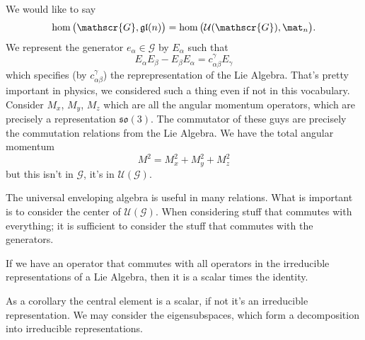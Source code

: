 We would like to say
\begin{equation}
\hom\big(\mathscr{G},\mathfrak{gl}(n)\big)=\hom\big(\mathcal{U}(\mathscr{G}),\mat_{n}\big).
\end{equation}
We represent the generator $e_{\alpha}\in\mathscr{G}$ by
$E_{\alpha}$ such that
\begin{equation}
E_{\alpha}E_{\beta}-E_{\beta}E_{\alpha}=c^{\gamma}_{\alpha\beta}E_{\gamma}
\end{equation}
which specifies (by $c^{\gamma}_{\alpha\beta}$) the
reprepresentation of the Lie Algebra. That's pretty important in
physics, we considered such a thing even if not in this
vocabulary. Consider $M_{x}$, $M_{y}$, $M_{z}$ which are all the
angular momentum operators, which are precisely a representation
$\mathfrak{so}(3)$. The commutator of these guys are precisely
the commutation relations from the Lie Algebra. We have the total
angular momentum
\begin{equation}
M^{2}=M_{x}^{2}+M_{y}^{2}+M_{z}^{2}
\end{equation}
but this isn't in $\mathscr{G}$, it's in
$\mathcal{U}(\mathscr{G})$.

The universal enveloping algebra is useful in many
relations. What is important is to consider the center of
$\mathcal{U}(\mathscr{G})$. When considering stuff that commutes
with everything; it is sufficient to consider the stuff that
commutes with the generators.

\begin{schur}
If we have an operator that commutes with all operators in the
irreducible representations of a Lie Algebra, then it is a scalar
times the identity.
\end{schur}

As a corollary the central element is a scalar, if not it's an
irreducible representation. We may consider the eigensubspaces,
which form a decomposition into irreducible representations.

